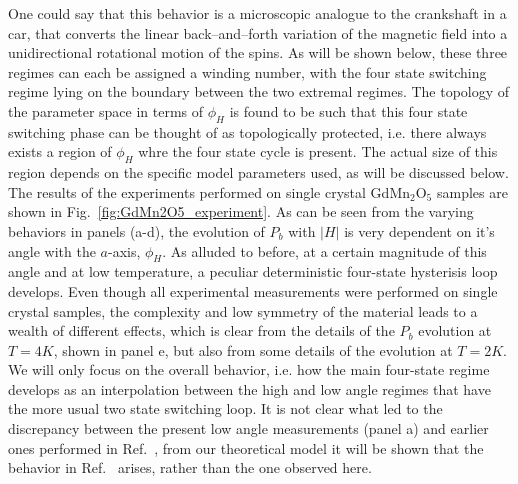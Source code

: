 One could say that this behavior is a microscopic analogue to the crankshaft in a car, that converts the linear back--and--forth variation of the magnetic field into a unidirectional rotational motion of the spins.
As will be shown below, these three regimes can each be assigned a winding number, with the four state switching regime lying on the boundary between the two extremal regimes.
The topology of the parameter space in terms of $\phi_H$ is found to be such that this four state switching phase can be thought of as topologically protected, i.e. there always exists a region of $\phi_H$ whre the four state cycle is present. The actual size of this region depends on the specific model parameters used, as will be discussed below.
The results of the experiments performed on single crystal GdMn$_2$O$_5$ samples are shown in Fig.~\ref{fig:GdMn2O5_experiment}. As can be seen from the varying behaviors in panels (a-d), the evolution of $P_b$ with $|H|$ is very dependent on it's angle with the $a$-axis, $\phi_H$.
As alluded to before, at a certain magnitude of this angle and at low temperature, a peculiar deterministic four-state hysterisis loop develops.
Even though all experimental measurements were performed on single crystal samples, 
the complexity and low symmetry of the material leads to a wealth of different effects, which is clear from the details of the $P_b$ evolution at $T=4K$, shown in panel e, but also from some details of the evolution at $T=2K$.
We will only focus on the overall behavior, i.e. how the main four-state regime develops as an interpolation between the high and low angle regimes that have the more usual two state switching loop.
It is not clear what led to the discrepancy between the present low angle measurements (panel a) and earlier ones performed in Ref.~\cite{Lee13}, from our theoretical model it will be shown that the behavior in Ref.~\cite{Lee13} arises, rather than the one observed here.
